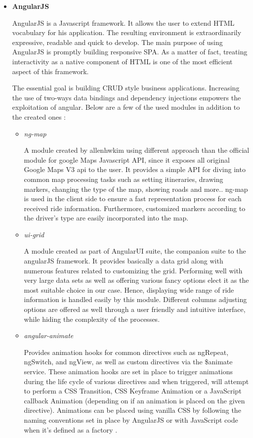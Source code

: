 \begin{itemize}
\item \textbf{AngularJS } 

AngularJS is a Javascript framework. It allows the user to extend HTML vocabulary for his application. The resulting environment is extraordinarily expressive, readable and quick to develop. The main purpose of using AngularJS is promptly building responsive SPA. As a matter of fact, treating interactivity as a native component of HTML is one of the most efficient aspect of this framework.

The essential goal is building CRUD style business applications. Increasing the use of two-ways data bindings and dependency injections empowers the exploitation of angular.
Below are a few of the used modules in addition to the created ones :

\begin{itemize}[label=]

\item\textit{ng-map }

A module created by allenhwkim using different approach than the official module for google Maps Javascript API, since it exposes all original Google Maps V3 api to the user. It provides a simple API for diving into common map processing tasks such as setting itineraries, drawing markers, changing the type of the map, showing roads and more.. ng-map is used in the client side to ensure a fast representation process for each received ride information. Furthermore, customized markers according to the driver's type are easily incorporated into the map.


\item\textit{ui-grid }

A module created as part of AngularUI suite, the companion suite to the angularJS framework. It provides basically a data grid along with numerous features related to customizing the grid. Performing well with very large data sets as well as offering various fancy options elect it as the most suitable choice in our case. Hence, displaying wide range of ride information is handled easily by this module. Different columns adjusting options are offered as well through a user friendly and intuitive interface, while hiding the complexity of the processes.  


\item\textit{angular-animate}

Provides animation hooks for common directives such as ngRepeat, ngSwitch, and ngView, as well as custom directives via the \$animate service. These animation hooks are set in place to trigger animations during the life cycle of various directives and when triggered, will attempt to perform a CSS Transition, CSS Keyframe Animation or a JavaScript callback Animation (depending on if an animation is placed on the given directive). Animations can be placed using vanilla CSS by following the naming conventions set in place by AngularJS or with JavaScript code when it's defined as a factory \cite{ngAnimate}.


\end{itemize}
\end{itemize}
